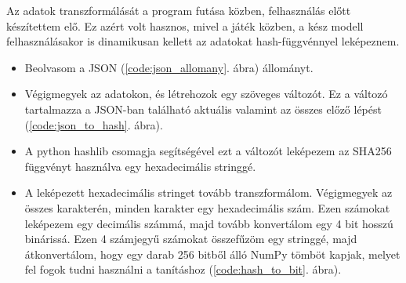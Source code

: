 Az adatok transzformálását a program futása közben, felhasználás előtt készítettem elő. Ez azért volt hasznos, mivel a játék közben, a kész modell felhasználásakor is dinamikusan kellett az adatokat hash-függvénnyel leképeznem.

\begin{itemize}
    \item Beolvasom a JSON (\ref{code:json_allomany}. ábra) állományt. 
    \item Végigmegyek az adatokon, és létrehozok egy szöveges változót. Ez a változó tartalmazza a JSON-ban található aktuális valamint az összes előző lépést  (\ref{code:json_to_hash}. ábra). 
    \item A python hashlib csomagja segítségével ezt a változót leképezem az SHA256 függvényt használva egy hexadecimális stringgé. 
    \item A leképezett hexadecimális stringet tovább transzformálom. 
    Végigmegyek az összes karakterén, minden karakter egy hexadecimális szám. Ezen számokat leképezem egy decimális számmá, majd tovább konvertálom egy 4 bit hosszú binárissá. Ezen 4 számjegyű számokat összefűzöm egy stringgé, majd átkonvertálom, hogy egy darab 256 bitből álló NumPy tömböt kapjak, melyet fel fogok tudni használni a tanításhoz (\ref{code:hash_to_bit}. ábra). 
\end{itemize}

